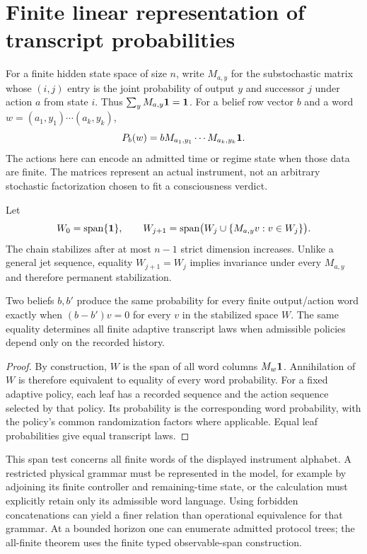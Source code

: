 \section{Finite linear representation of transcript probabilities}\label{section:predictive:finite-linear-representation-of-transcript-probabilities}
For a finite hidden state space of size $n$, write $M_{a,y}$ for the substochastic matrix whose $(i,j)$ entry is the joint probability of output $y$ and successor $j$ under action $a$ from state $i$. Thus $\sum_yM_{a,y}\mathbf 1=\mathbf 1$. For a belief row vector $b$ and a word $w=(a_1,y_1)\cdots(a_k,y_k)$,
\[
P_b(w)=bM_{a_1,y_1}\cdots M_{a_k,y_k}\mathbf 1.
\]
The actions here can encode an admitted time or regime state when those data are finite. The matrices represent an actual instrument, not an arbitrary stochastic factorization chosen to fit a consciousness verdict.

Let
\[
W_0=\operatorname{span}\{\mathbf 1\},\qquad
W_{j+1}=\operatorname{span}\bigl(W_j\cup\{M_{a,y}v:v\in W_j\}\bigr).
\]
The chain stabilizes after at most $n-1$ strict dimension increases. Unlike a general jet sequence, equality $W_{j+1}=W_j$ implies invariance under every $M_{a,y}$ and therefore permanent stabilization.

\begin{proposition}\label{prop:word-equivalence}
Two beliefs $b,b'$ produce the same probability for every finite output/action word exactly when $(b-b')v=0$ for every $v$ in the stabilized space $W$. The same equality determines all finite adaptive transcript laws when admissible policies depend only on the recorded history.
\end{proposition}
\begin{proof}
By construction, $W$ is the span of all word columns $M_w\mathbf 1$. Annihilation of $W$ is therefore equivalent to equality of every word probability. For a fixed adaptive policy, each leaf has a recorded sequence and the action sequence selected by that policy. Its probability is the corresponding word probability, with the policy's common randomization factors where applicable. Equal leaf probabilities give equal transcript laws.
\end{proof}

This span test concerns all finite words of the displayed instrument alphabet. A restricted physical grammar must be represented in the model, for example by adjoining its finite controller and remaining-time state, or the calculation must explicitly retain only its admissible word language. Using forbidden concatenations can yield a finer relation than operational equivalence for that grammar. At a bounded horizon one can enumerate admitted protocol trees; the all-finite theorem uses the finite typed observable-span construction.

